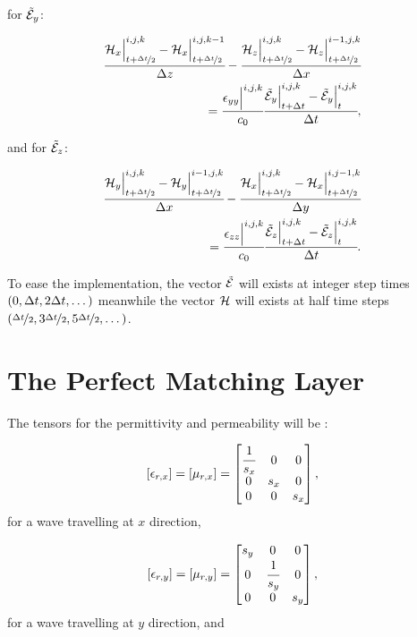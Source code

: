 for $\tilde{\mathcal{E}}_y$:

\begin{small}
    \begin{align}
        \cfrac{\mathcal{H}_x\Big|^{i,j,k}_{t+\nicefrac{\Delta t}{2}}-\mathcal{H}_x\Big|^{i,j,k-1}_{t+\nicefrac{\Delta t}{2}}}{\Delta z} - \cfrac{\mathcal{H}_z\Big|^{i,j,k}_{t+\nicefrac{\Delta t}{2}}-\mathcal{H}_z\Big|^{i-1,j,k}_{t+\nicefrac{\Delta t}{2}}}{\Delta x} \nonumber\\ =
        \cfrac{\epsilon_{yy}\Big|^{i,j,k}}{c_0}\cfrac{\tilde{\mathcal{E}}_y\Big|^{i,j,k}_{t+\Delta t}-\tilde{\mathcal{E}}_y\Big|^{i,j,k}_{t}}{\Delta t},
        \label{eq:fd_ey}
    \end{align}
\end{small}
and for $\tilde{\mathcal{E}}_z$:

\begin{small}
    \begin{align}
        \cfrac{\mathcal{H}_y\Big|^{i,j,k}_{t+\nicefrac{\Delta t}{2}}-\mathcal{H}_y\Big|^{i-1,j,k}_{t+\nicefrac{\Delta t}{2}}}{\Delta x} - \cfrac{\mathcal{H}_x\Big|^{i,j,k}_{t+\nicefrac{\Delta t}{2}}-\mathcal{H}_x\Big|^{i,j-1,k}_{t+\nicefrac{\Delta t}{2}}}{\Delta y} \nonumber\\
        =
        \cfrac{\epsilon_{zz}\Big|^{i,j,k}}{c_0}\cfrac{\tilde{\mathcal{E}}_z\Big|^{i,j,k}_{t+\Delta t}-\tilde{\mathcal{E}}_z\Big|^{i,j,k}_{t}}{\Delta t}.
        \label{eq:fd_ez}
    \end{align}
\end{small}

To ease the implementation, the vector $\tilde{\mathcal{E}}$ will exists at integer step times $(0, \Delta t, 2\Delta t, \dots)$ meanwhile the vector $\mathcal{H}$ will exists at half time steps $(\nicefrac{\Delta t}{2}, 3\nicefrac{\Delta t}{2}, 5\nicefrac{\Delta t}{2}, \dots)$.

\section{The Perfect Matching Layer}

The tensors for the permittivity and permeability will be \cite{rumpf_book}:

\begin{equation}
    \brackets{\epsilon_{r,x}} = \brackets{\mu_{r,x}} = \begin{bmatrix}
        \cfrac{1}{s_x} & 0 & 0 \\
        0 & s_x & 0 \\
        0 & 0 & s_x
    \end{bmatrix},
\end{equation}
for a wave travelling at $x$ direction,

\begin{equation}
    \brackets{\epsilon_{r,y}} = \brackets{\mu_{r,y}} = \begin{bmatrix}
        s_y & 0 & 0 \\
        0 & \cfrac{1}{s_y} & 0 \\
        0 & 0 & s_y
    \end{bmatrix},
\end{equation}
for a wave travelling at $y$ direction, and

